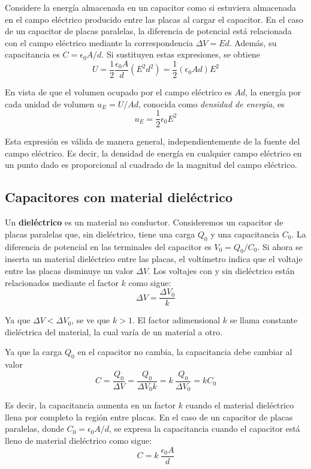     \VS
    \PN Considere la energía almacenada en un capacitor como si estuviera almacenada en el campo eléctrico producido
    entre las placas al cargar el capacitor. En el caso de un capacitor de placas paralelas, la diferencia de potencial
    está relacionada con el campo eléctrico mediante la correspondencia $\Delta V = Ed$. Además, su capacitancia es
    $C = \epsilon_{0} A/d$. Si sustituyen estas expresiones, se obtiene
    \begin{equation*}
      U = \frac{1}{2} \frac{\epsilon_{0}A}{d} (E^{2}d^{2}) = \frac{1}{2} (\epsilon_{0}Ad) E^{2}
    \end{equation*}

    \PN En vista de que el volumen ocupado por el campo eléctrico es $Ad$, la energía por cada unidad de volumen
    $u_{E} = U/Ad$, conocida como \textit{densidad de energía}, es
    \begin{equation*}
      u_{E} = \frac{1}{2} \epsilon_{0} E^{2}
    \end{equation*}

    \PN Esta expresión es válida de manera general, independientemente de la fuente del campo eléctrico. Es decir, la
    densidad de energía en cualquier campo eléctrico en un punto dado es proporcional al cuadrado de la magnitud del
    campo eléctrico.

  \subsection{Capacitores con material dieléctrico}
    \PN Un \textbf{dieléctrico} es un material no conductor. Consideremos un capacitor de placas paralelas que, sin
    dieléctrico, tiene una carga $Q_{0}$ y una capacitancia $C_{0}$. La diferencia de potencial en las terminales del
    capacitor es $V_{0} = Q_{0}/C_{0}$. Si ahora se inserta un material dieléctrico entre las placas, el voltímetro
    indica que el voltaje entre las placas disminuye un valor $\Delta V$. Los voltajes con y sin dieléctrico están
    relacionados mediante el factor $k$ como sigue:
    \begin{equation*}
      \Delta V = \frac{\Delta V_{0}}{k}
    \end{equation*}

    \PN Ya que $\Delta V < \Delta V_{0}$, se ve que $k > 1$. El factor adimensional $k$ se llama constante dieléctrica
    del material, la cual varía de un material a otro.

    \VS
    \PN Ya que la carga $Q_{0}$ en el capacitor no cambia, la capacitancia debe cambiar al valor
    \begin{equation*}
      C = \frac{Q_{0}}{\Delta V} = \frac{Q_{0}}{\Delta V_{0} k} = k \ \frac{Q_{0}}{\Delta V_{0}} = k C_{0}
    \end{equation*}

    \PN Es decir, la capacitancia aumenta en un factor $k$ cuando el material dieléctrico llena por completo la región
    entre placas. En el caso de un capacitor de placas paralelas, donde $C_{0} = \epsilon_{0}A/d$, se expresa la
    capacitancia cuando el capacitor está lleno de material dieléctrico como sigue:
    \begin{equation*}
      C = k \ \frac{\epsilon_{0}A}{d}
    \end{equation*}
